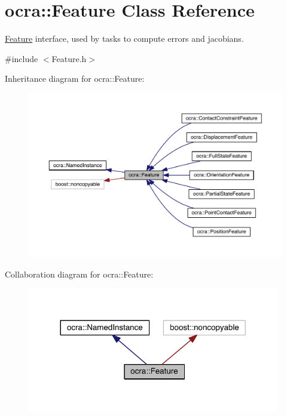 \hypertarget{classocra_1_1Feature}{}\section{ocra\+:\+:Feature Class Reference}
\label{classocra_1_1Feature}


\hyperlink{classocra_1_1Feature}{Feature} interface, used by tasks to compute errors and jacobians.  




{\ttfamily \#include $<$Feature.\+h$>$}



Inheritance diagram for ocra\+:\+:Feature\+:\nopagebreak
\begin{figure}[H]
\begin{center}
\leavevmode
\includegraphics[width=350pt]{d8/daa/classocra_1_1Feature__inherit__graph}
\end{center}
\end{figure}


Collaboration diagram for ocra\+:\+:Feature\+:\nopagebreak
\begin{figure}[H]
\begin{center}
\leavevmode
\includegraphics[width=312pt]{df/da1/classocra_1_1Feature__coll__graph}
\end{center}
\end{figure}
